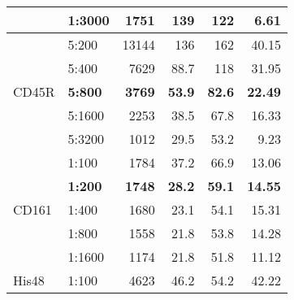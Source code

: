\begin{sidewaystable}[!htbp]
\begin{tabular}{llrrrr}
                       & 1:3000   & 1751                                    & 139                                     & 122                                        & 6.61           \\
\hline
\multirow{5}{*}{CD45R} & 5:200    & 13144                                   & 136                                     & 162                                        & 40.15          \\
                       & 5:400    & 7629                                    & 88.7                                    & 118                                        & 31.95          \\
                       & \textbf{5:800}    & \textbf{3769}                                    & \textbf{53.9}                                    & \textbf{82.6}                                       & \textbf{22.49}          \\
                       & 5:1600   & 2253                                    & 38.5                                    & 67.8                                       & 16.33          \\
                       & 5:3200   & 1012                                    & 29.5                                    & 53.2                                       & 9.23           \\
\hline
\multirow{5}{*}{CD161} & 1:100    & 1784                                    & 37.2                                    & 66.9                                       & 13.06          \\
                       & \textbf{1:200}    & \textbf{1748}                                   & \textbf{28.2}                                    & \textbf{59.1}                                       & \textbf{14.55}          \\
                       & 1:400    & 1680                                    & 23.1                                    & 54.1                                       & 15.31          \\
                       & 1:800    & 1558                                    & 21.8                                    & 53.8                                       & 14.28          \\
                       & 1:1600   & 1174                                    & 21.8                                    & 51.8                                       & 11.12          \\
\hline
\multirow{5}{*}{His48} & 1:100    & 4623                                    & 46.2                                    & 54.2                                       & 42.22          \\

\end{tabular}
\end{sidewaystable}
